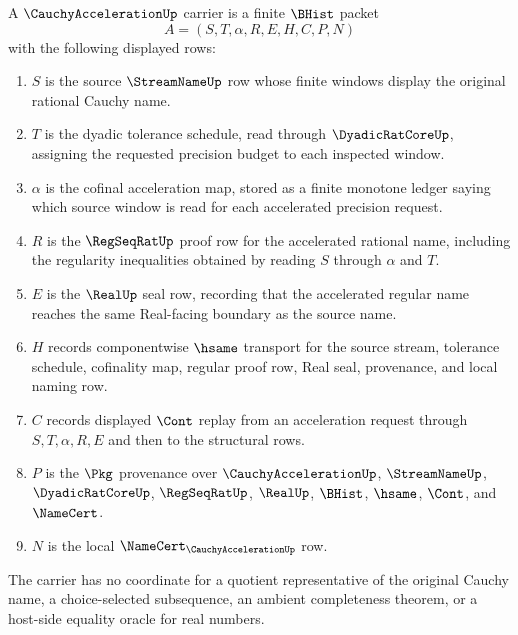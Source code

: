 \begin{definition}
\label{def:cauchy-acceleration-carrier}
A $\CauchyAccelerationUp$ carrier is a finite $\BHist$ packet
$$
A=(S,T,\alpha,R,E,H,C,P,N)
$$
with the following displayed rows:
\begin{enumerate}
\item $S$ is the source $\StreamNameUp$ row whose finite windows display the original rational Cauchy name.
\item $T$ is the dyadic tolerance schedule, read through $\DyadicRatCoreUp$, assigning the requested precision budget to each inspected window.
\item $\alpha$ is the cofinal acceleration map, stored as a finite monotone ledger saying which source window is read for each accelerated precision request.
\item $R$ is the $\RegSeqRatUp$ proof row for the accelerated rational name, including the regularity inequalities obtained by reading $S$ through $\alpha$ and $T$.
\item $E$ is the $\RealUp$ seal row, recording that the accelerated regular name reaches the same Real-facing boundary as the source name.
\item $H$ records componentwise $\hsame$ transport for the source stream, tolerance schedule, cofinality map, regular proof row, Real seal, provenance, and local naming row.
\item $C$ records displayed $\Cont$ replay from an acceleration request through $S,T,\alpha,R,E$ and then to the structural rows.
\item $P$ is the $\Pkg$ provenance over $\CauchyAccelerationUp$, $\StreamNameUp$, $\DyadicRatCoreUp$, $\RegSeqRatUp$, $\RealUp$, $\BHist$, $\hsame$, $\Cont$, and $\NameCert$.
\item $N$ is the local $\NameCert_{\CauchyAccelerationUp}$ row.
\end{enumerate}
The carrier has no coordinate for a quotient representative of the original Cauchy name, a choice-selected subsequence, an ambient completeness theorem, or a host-side equality oracle for real numbers.
\end{definition}

